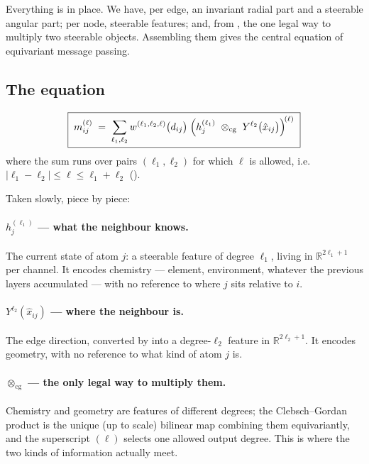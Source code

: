 \documentclass[11pt,a4paper]{report}
\theoremstyle{definition}
\theoremstyle{remark}
\newcommand{\RR}{\mathbb R}
\begin{document}
Everything is in place. We have, per edge, an invariant radial part and a
steerable angular part; per node, steerable features; and, from
, the one legal way to multiply two steerable
objects. Assembling them gives the central equation of equivariant message
passing.

\subsection{The equation}

\begin{equation}
\label{eq:steerable-message}
\boxed{\;
m^{(\ell)}_{ij}
\;=\;
\sum_{\ell_1,\ell_2}
w^{(\ell_1,\ell_2,\ell)}\bigl(d_{ij}\bigr)\;
\Bigl(h^{(\ell_1)}_{j}\ \otimes_{\mathrm{cg}}\ Y^{\ell_2}\bigl(\hat x_{ij}\bigr)\Bigr)^{\!(\ell)}
\;}
\end{equation}
where the sum runs over pairs $(\ell_1,\ell_2)$ for which $\ell$ is allowed,
i.e.\ $|\ell_1-\ell_2|\le\ell\le\ell_1+\ell_2$ ().

Taken slowly, piece by piece:

\paragraph{$h^{(\ell_1)}_{j}$ --- what the neighbour knows.}
The current state of atom $j$: a steerable feature of degree $\ell_1$,
living in $\RR^{2\ell_1+1}$ per channel. It encodes chemistry --- element,
environment, whatever the previous layers accumulated --- with no reference
to where $j$ sits relative to $i$.

\paragraph{$Y^{\ell_2}(\hat x_{ij})$ --- where the neighbour is.}
The edge direction, converted by  into a
degree-$\ell_2$ feature in $\RR^{2\ell_2+1}$. It encodes geometry, with no
reference to what kind of atom $j$ is.

\paragraph{$\otimes_{\mathrm{cg}}$ --- the only legal way to multiply them.}
Chemistry and geometry are features of different degrees; the Clebsch--Gordan
product is the unique (up to scale) bilinear map combining them
equivariantly, and the superscript $(\ell)$ selects one allowed output
degree. This is where the two kinds of information actually meet.
\end{document}
